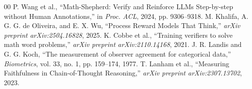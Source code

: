 \documentclass[conference]{IEEEtran}
\begin{document}
\begin{thebibliography}{00}
 P. Wang et al., ``Math-Shepherd: Verify and Reinforce LLMs Step-by-step without Human Annotations,'' in \textit{Proc. ACL}, 2024, pp. 9306--9318.
 M. Khalifa, A. G. G. de Oliveira, and E. X. Wu, ``Process Reward Models That Think,'' \textit{arXiv preprint arXiv:2504.16828}, 2025.
 K. Cobbe et al., ``Training verifiers to solve math word problems,'' \textit{arXiv preprint arXiv:2110.14168}, 2021.
 J. R. Landis and G. G. Koch, ``The measurement of observer agreement for categorical data,'' \textit{Biometrics}, vol. 33, no. 1, pp. 159--174, 1977.
 T. Lanham et al., ``Measuring Faithfulness in Chain-of-Thought Reasoning,'' \textit{arXiv preprint arXiv:2307.13702}, 2023.
\end{thebibliography}
\end{document}
